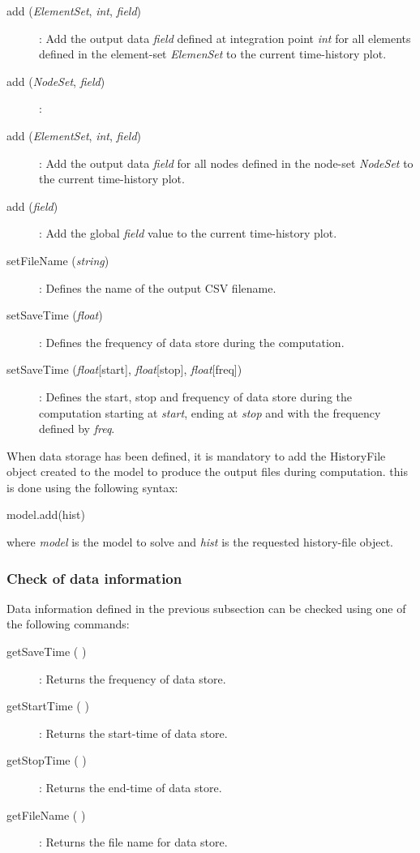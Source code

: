 \begin{description}
\item [{add (\emph{ElementSet}, \emph{int}, \emph{field})}] : Add the output data \emph{field} defined at integration point \emph{int} for all elements defined in the element-set \emph{ElemenSet} to the current time-history plot.
\item [{add (\emph{NodeSet}, \emph{field})}] : 
\item [{add (\emph{ElementSet}, \emph{int}, \emph{field})}] : Add the output data \emph{field} for all nodes defined in the node-set \emph{NodeSet} to the current time-history plot.
\item [{add (\emph{field})}] : Add the global \emph{field} value to the current time-history plot.
\item [{setFileName (\emph{string})}] : Defines the name of the output CSV filename.
\item [{setSaveTime (\emph{float})}] : Defines the frequency of data store during the computation.
\item [{setSaveTime (\emph{float}[start], \emph{float}[stop], \emph{float}[freq])}] : Defines the start, stop and frequency of data store during the computation starting at \emph{start}, ending at \emph{stop} and with the frequency defined by \emph{freq}.
\end{description}

When data storage has been defined, it is mandatory to add the \textsf{HistoryFile} object created to the \textsf{model} to produce the output files during computation. this is done using the following syntax:
\begin{PythonListing}
model.add(hist)
\end{PythonListing}
where \emph{model} is the \textsf{model} to solve and \emph{hist} is the requested history-file object.

\subsubsection{Check of data information}
Data information defined in the previous subsection can be checked using one of the following commands:
\begin{description}
\item [{getSaveTime ( )}] : Returns the frequency of data store.
\item [{getStartTime ( )}] : Returns the start-time of data store. 
\item [{getStopTime ( )}] : Returns the end-time of data store.
\item [{getFileName ( )}] : Returns the file name for data store.
\end{description}

